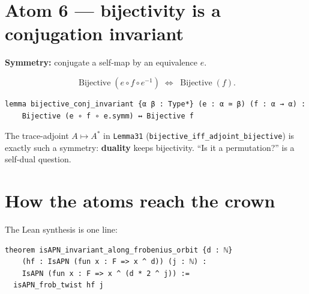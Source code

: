 \documentclass[11pt]{article}
\begin{document}
\section{Atom 6 --- bijectivity is a conjugation invariant}

\textbf{Symmetry:} conjugate a self-map by an equivalence $e$.

\[
  \operatorname{Bijective}(e\circ f\circ e^{-1})
  \;\Longleftrightarrow\;
  \operatorname{Bijective}(f).
\]

\begin{lstlisting}
lemma bijective_conj_invariant {α β : Type*} (e : α ≃ β) (f : α → α) :
    Bijective (e ∘ f ∘ e.symm) ↔ Bijective f
\end{lstlisting}

\begin{center}
\end{center}

\begin{coolfact}
The trace-adjoint $A\mapsto A^{*}$ in \texttt{Lemma31}
(\texttt{bijective\_iff\_adjoint\_bijective}) is exactly such a symmetry:
\textbf{duality} keeps bijectivity. ``Is it a permutation?'' is a self-dual
question.
\end{coolfact}

\section{How the atoms reach the crown}

\begin{center}
\end{center}

The Lean synthesis is one line:

\begin{lstlisting}
theorem isAPN_invariant_along_frobenius_orbit {d : ℕ}
    (hf : IsAPN (fun x : F => x ^ d)) (j : ℕ) :
    IsAPN (fun x : F => x ^ (d * 2 ^ j)) :=
  isAPN_frob_twist hf j
\end{lstlisting}
\end{document}
